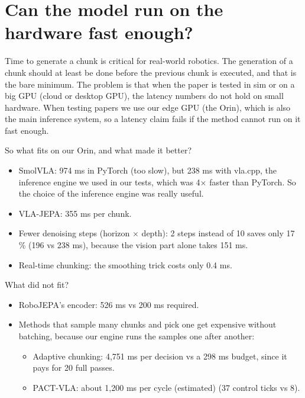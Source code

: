 \documentclass[10pt,twocolumn]{article}
\begin{document}
\section{Can the model run on the hardware fast enough?}


Time to generate a chunk is critical for real-world robotics. The generation of a chunk should at least be done before the previous chunk is executed, and that is the bare minimum. The problem is that when the paper is tested in sim or on a big GPU (cloud or desktop GPU), the latency numbers do not hold on small hardware.
When testing papers we use our edge GPU (the Orin), which is also the main inference system, so a latency claim fails if the method cannot run on it fast enough.


So what fits on our Orin, and what made it better?


\begin{itemize}\setlength{\itemsep}{0pt}\setlength{\parskip}{0pt}\footnotesize
\item SmolVLA: 974 ms in PyTorch (too slow), but 238 ms with vla.cpp, the inference engine we used in our tests, which was 4$\times$ faster than PyTorch. So the choice of the inference engine was really useful.
\item VLA-JEPA: 355 ms per chunk.
\item Fewer denoising steps (horizon $\times$ depth): 2 steps instead of 10 saves only 17 \% (196 vs 238 ms), because the vision part alone takes 151 ms.
\item Real-time chunking: the smoothing trick costs only 0.4 ms.
\end{itemize}


What did not fit?


\begin{itemize}\setlength{\itemsep}{0pt}\setlength{\parskip}{0pt}\footnotesize
\item RoboJEPA's encoder: 526 ms vs 200 ms required.
\item Methods that sample many chunks and pick one get expensive without batching, because our engine runs the samples one after another:
\begin{itemize}\setlength{\itemsep}{0pt}
\item Adaptive chunking: 4,751 ms per decision vs a 298 ms budget, since it pays for 20 full passes.
\item PACT-VLA: about 1,200 ms per cycle (estimated) (37 control ticks vs 8).
\end{itemize}
\end{itemize}
\end{document}
